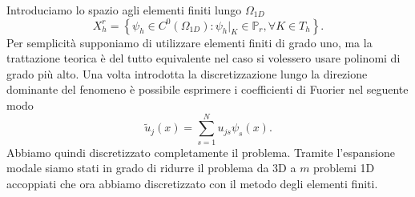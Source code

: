 Introduciamo lo spazio agli elementi finiti lungo $\Omega_{1D}$
\begin{equation*}
\label{eq: spazio polinomiale}
X_h^r= \left\{\psi_h \in C^0(\Omega_{1D}): \psi_h \vert_K  \in \mathbb{P}_r,\forall K\in T_h \right\}.
\end{equation*}
Per semplicit\`a supponiamo di utilizzare elementi finiti di grado uno, ma
la trattazione teorica \`e del tutto equivalente nel caso si volessero usare 
polinomi di grado pi\`u alto.
Una volta introdotta la discretizzazione lungo la direzione dominante 
del fenomeno \`e possibile esprimere i coefficienti di Fuorier 
nel seguente modo
\begin{equation*}
\label{eq: coeff fourier espansi}
\tilde{u}_j(x)=\sum_{s=1}^Nu_{js}\psi_s(x).
\end{equation*}
Abbiamo quindi discretizzato completamente il problema. Tramite l'espansione modale
siamo stati in grado di ridurre il problema da 3D a $m$ problemi 1D accoppiati che ora
abbiamo discretizzato con il metodo degli elementi finiti.

